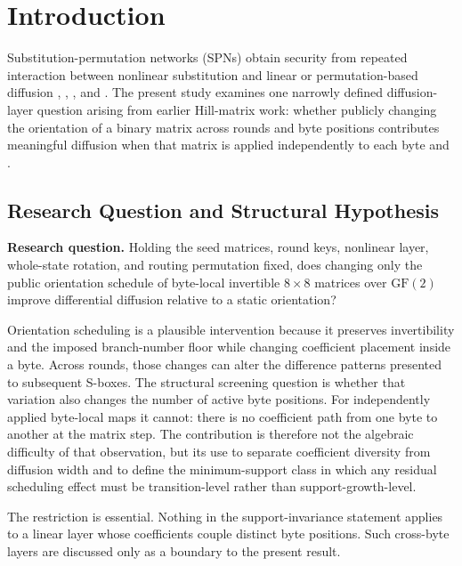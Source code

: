 \documentclass[cryptography,article,submit,oneauthor]{Definitions/mdpi}
\begin{document}
\section{Introduction}\label{sec:1}
Substitution-permutation networks (SPNs) obtain security from repeated interaction between nonlinear substitution and linear or permutation-based diffusion \cite{ref1}, \cite{ref2}, \cite{ref4}, and \cite{ref21}. The present study examines one narrowly defined diffusion-layer question arising from earlier Hill-matrix work: whether publicly changing the orientation of a binary matrix across rounds and byte positions contributes meaningful diffusion when that matrix is applied independently to each byte \cite{ref10} and \cite{ref11}.

\subsection{Research Question and Structural Hypothesis}\label{sec:1-1}
\noindent\textbf{Research question.} Holding the seed matrices, round keys, nonlinear layer, whole-state rotation, and routing permutation fixed, does changing only the public orientation schedule of byte-local invertible $8\times8$ matrices over $\mathrm{GF}(2)$ improve differential diffusion relative to a static orientation?

Orientation scheduling is a plausible intervention because it preserves invertibility and the imposed branch-number floor while changing coefficient placement inside a byte. Across rounds, those changes can alter the difference patterns presented to subsequent S-boxes. The structural screening question is whether that variation also changes the number of active byte positions. For independently applied byte-local maps it cannot: there is no coefficient path from one byte to another at the matrix step. The contribution is therefore not the algebraic difficulty of that observation, but its use to separate coefficient diversity from diffusion width and to define the minimum-support class in which any residual scheduling effect must be transition-level rather than support-growth-level.

The restriction is essential. Nothing in the support-invariance statement applies to a linear layer whose coefficients couple distinct byte positions. Such cross-byte layers are discussed only as a boundary to the present result.
\end{document}
